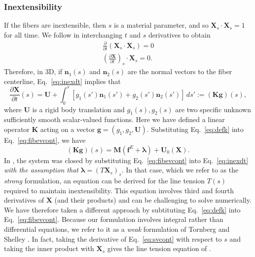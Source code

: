 \subsubsection{Inextensibility}
If the fibers are inextensible, then $s$ is a material parameter, and so $\bm{X}_s \cdot \bm{X}_s=1$ for all time. We follow \cite{ts04} in interchanging $t$ and $s$ derivatives to obtain 
\begin{gather}
\frac{\partial}{\partial t}\left(\bm{X}_s \cdot \bm{X}_s \right) = 0\\[2 pt]
\label{eq:inexdt}
\left(\frac{\partial \bm{X}}{\partial t}\right)_s \cdot \bm{X}_s = 0. 
\end{gather}
Therefore, in 3D, if $\bm{n}_1(s)$ and $\bm{n}_2(s)$ are the normal vectors to the fiber centerline, Eq.\ \eqref{eq:inexdt} implies that 
\begin{equation}
\label{eq:defk}
\frac{\partial \bm{X}}{\partial t}(s) = \bm{U}+\int_0^s \left[g_1(s') \bm{n}_1(s') + g_2(s') \bm{n}_2(s')\right]\,ds' := (\bm{K}\bm{g})(s), 
\end{equation}
where $\bm{U}$ is a rigid body translation and $g_1(s), g_2(s)$ are two specific unknown sufficiently smooth scalar-valued functions. Here we have defined a linear operator $\bm{K}$ acting on a vector $\bm{g}=(g_1,g_2,\bm{U})$. 
Substituting Eq.\ \eqref{eq:defk} into Eq.\ \eqref{eq:fibevcont}, we have 
\begin{equation}
\label{eq:svcont}
\left(\bm{K}\bm{g}\right)(s) = \bm{M}\left(\bm{f}^E+\bm{\lambda}\right)+\bm{U}_0(\bm{X}). 
\end{equation}
In \cite{ts04}, the system was closed by substituting Eq.\ \eqref{eq:fibevcont} into Eq.\ \eqref{eq:inexdt} \textit{with the assumption that} $\bm{\lambda}=(T\bm{X}_s)_s$. In that case, which we refer to as the \textit{strong} formulation, an equation can be derived for the line tension $T(s)$ required to maintain inextensibility. This equation involves third and fourth derivatives of $\bm{X}$ (and their products) and can be challenging to solve numerically. We have therefore taken a different approach by subtituting Eq.\ \eqref{eq:defk} into Eq.\ \eqref{eq:fibevcont}. Because our formulation involves integral rather than differential equations, we refer to it as a \textit{weak} formulation of Tornberg and Shelley \cite{ts04}. In fact, taking the derivative of Eq.\ \eqref{eq:svcont} with respect to $s$ and taking the inner product with $\bm{X}_s$ gives the line tension equation of \cite{ts04}. 

